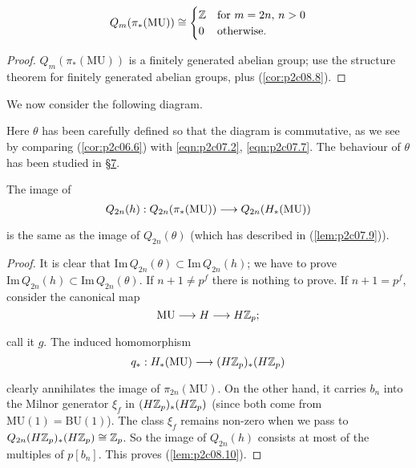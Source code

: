 \documentclass[../main]{subfiles}
\begin{document}
\begin{corollary}
\label{cor:p2c08.9}
\[Q_m(\pi_\ast(\mathrm{MU})) \cong \begin{cases}\mathbb{Z} & \text {for } m = 2n, \, n > 0 \\ 0 & \text{otherwise.}\end{cases}\]
\end{corollary}

\begin{proof}
$Q_m(\pi_\ast(\mathrm{MU}))$ is a finitely generated abelian group; use the structure theorem for finitely generated abelian groups, plus (\ref{cor:p2c08.8}).
\end{proof}

We now consider the following diagram. 

\begin{center}
\end{center}

Here $\theta$ has been carefully defined so that the diagram is commutative, as we see by comparing (\ref{cor:p2c06.6}) with \eqref{eqn:p2c07.2}, \eqref{eqn:p2c07.7}. The behaviour of $\theta$ has been studied in \hyperref[sec:p2c7]{\S 7}. 

\begin{lemma}
\label{lem:p2c08.10}
The image of \[Q_{2n}(h) : Q_{2n}(\pi_\ast(\mathrm{MU})) \lar{} Q_{2n}(H_\ast(\mathrm{MU}))\] is the same as the image of $Q_{2n}(\theta)$ (which has described in (\ref{lem:p2c07.9})). 
\end{lemma}

\begin{proof}
It is clear that $\mathrm{Im} \, Q_{2n}(\theta) \subset \mathrm{Im} \, Q_{2n}(h)$; we have to prove $\mathrm{Im} \, Q_{2n}(h) \subset \mathrm{Im} \, Q_{2n}(\theta)$. If $n + 1 \ne p^f$ there is nothing to prove. If $n + 1 = p^f$, consider the canonical map \[\mathrm{MU} \lar{} H \lar{} H \bbZ_p;\] call it $g$. The induced homomorphism \[q_\ast : H_\ast(\mathrm{MU}) \lar{} (H \bbZ_p)_\ast (H \bbZ_p)\] clearly annihilates the image of $\pi_{2n}(\mathrm{MU})$. On the other hand, it carries $b_n$ into the Milnor generator $\xi_f$ in $(H \mathbb{Z}_p)_\ast (H \mathbb{Z}_p)$ (since both come from $\mathrm{MU}(1) = \mathrm{BU}(1)$). The class $\xi_f$ remains non-zero when we pass to $Q_{2n}(H \mathbb{Z}_p)_\ast (H \mathbb{Z}_p) \cong \mathbb{Z}_p$. So the image of $Q_{2n}(h)$ consists at most of the multiples of $p[b_n]$. This proves (\ref{lem:p2c08.10}).
\end{proof}
\end{document}
